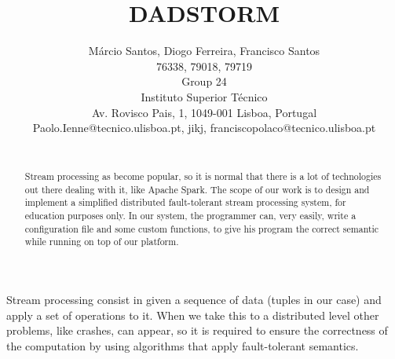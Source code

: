 \documentclass[times, 10pt,twocolumn]{article}
\begin{document}
\title{DADSTORM}

\author{Márcio Santos, Diogo Ferreira, Francisco Santos\\
76338, 79018, 79719\\Group 24\\Instituto Superior Técnico \\ Av. Rovisco Pais, 1, 1049-001 Lisboa, Portugal\\ Paolo.Ienne@tecnico.ulisboa.pt, jikj, franciscopolaco@tecnico.ulisboa.pt\\
\\}

\maketitle
\thispagestyle{empty}

\begin{abstract}
	Stream processing as become popular, so it is normal that there is a lot of technologies out there dealing with it, like Apache Spark.
	The scope of our work is to design and implement a simplified distributed fault-tolerant stream processing system, for education purposes only.
	In our system, the programmer can, very easily, write a configuration file and some custom functions, to give his program the correct semantic while running on top of our platform.
\end{abstract}




Stream processing consist in given a sequence of data (tuples in our case) and apply a set of operations to it. When we take this to a distributed level other problems, like crashes, can appear,
 so it is required to ensure the correctness of the computation by using algorithms that apply fault-tolerant semantics.
 
\end{document}
